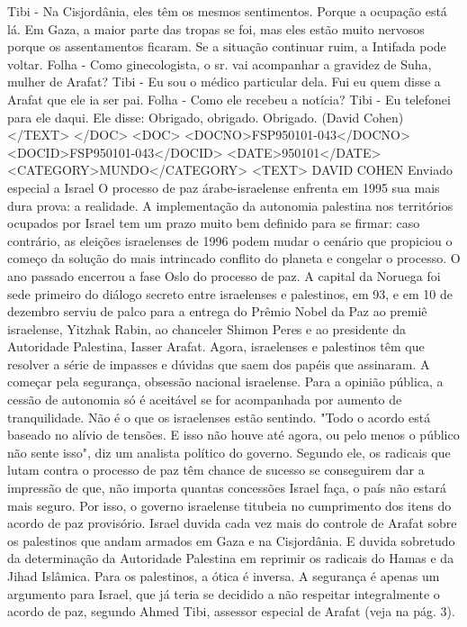 Tibi - Na Cisjordânia, eles têm os mesmos sentimentos. Porque a ocupação está lá. Em Gaza, a maior parte das tropas se foi, mas eles estão muito nervosos porque os assentamentos ficaram. Se a situação continuar ruim, a Intifada pode voltar.
Folha - Como ginecologista, o sr. vai acompanhar a gravidez de Suha, mulher de Arafat?
Tibi - Eu sou o médico particular dela. Fui eu quem disse a Arafat que ele ia ser pai.
Folha - Como ele recebeu a notícia?
Tibi - Eu telefonei para ele daqui. Ele disse:  Obrigado, obrigado. Obrigado.
(David Cohen)
</TEXT>
</DOC>
<DOC>
<DOCNO>FSP950101-043</DOCNO>
<DOCID>FSP950101-043</DOCID>
<DATE>950101</DATE>
<CATEGORY>MUNDO</CATEGORY>
<TEXT>
DAVID COHEN 
Enviado especial a Israel 
O processo de paz árabe-israelense enfrenta em 1995 sua mais dura prova: a realidade.
A implementação da autonomia palestina nos territórios ocupados por Israel tem um prazo muito bem definido para se firmar: caso contrário, as eleições israelenses de 1996 podem mudar o cenário que propiciou o começo da solução do mais intrincado conflito do planeta e congelar o processo.
O ano passado encerrou a fase Oslo do processo de paz. A capital da Noruega foi sede primeiro do diálogo secreto entre israelenses e palestinos, em 93, e em 10 de dezembro serviu de palco para a entrega do Prêmio Nobel da Paz ao premiê israelense, Yitzhak Rabin, ao chanceler Shimon Peres e ao presidente da Autoridade Palestina, Iasser Arafat.
Agora, israelenses e palestinos têm que resolver a série de impasses e dúvidas que saem dos papéis que assinaram.
A começar pela segurança, obsessão nacional israelense. Para a opinião pública, a cessão de autonomia só é aceitável se for acompanhada por aumento de tranquilidade. Não é o que os israelenses estão sentindo.
"Todo o acordo está baseado no alívio de tensões. E isso não houve até agora, ou pelo menos o público não sente isso", diz um analista político do governo.
Segundo ele, os radicais que lutam contra o processo de paz têm chance de sucesso se conseguirem dar a impressão de que, não importa quantas concessões Israel faça, o país não estará mais seguro.
Por isso, o governo israelense titubeia no cumprimento dos itens do acordo de paz provisório.
Israel duvida cada vez mais do controle de Arafat sobre os palestinos que andam armados em Gaza e na Cisjordânia. E duvida sobretudo da determinação da Autoridade Palestina em reprimir os radicais do Hamas e da Jihad Islâmica.
Para os palestinos, a ótica é inversa. A segurança é apenas um argumento para Israel, que já teria se decidido a não respeitar integralmente o acordo de paz, segundo Ahmed Tibi, assessor especial de Arafat (veja na pág. 3).
